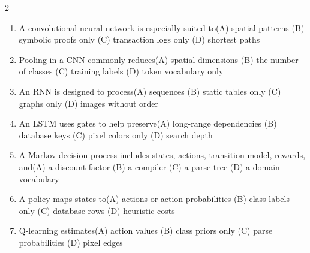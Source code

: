 \documentclass[a4paper]{article}
\begin{document}
\begin{multicols*}{2}
\begin{enumerate}[resume]
\item A convolutional neural network is especially suited to\newline\hspace*{0.6em}(A) spatial patterns \quad (B) symbolic proofs only \newline\hspace*{0.6em}(C) transaction logs only \quad (D) shortest paths
\item Pooling in a CNN commonly reduces\newline\hspace*{0.6em}(A) spatial dimensions \quad (B) the number of classes \newline\hspace*{0.6em}(C) training labels \quad (D) token vocabulary only
\item An RNN is designed to process\newline\hspace*{0.6em}(A) sequences \quad (B) static tables only \newline\hspace*{0.6em}(C) graphs only \quad (D) images without order
\item An LSTM uses gates to help preserve\newline\hspace*{0.6em}(A) long-range dependencies \quad (B) database keys \newline\hspace*{0.6em}(C) pixel colors only \quad (D) search depth
\item A Markov decision process includes states, actions, transition model, rewards, and\newline\hspace*{0.6em}(A) a discount factor \quad (B) a compiler \newline\hspace*{0.6em}(C) a parse tree \quad (D) a domain vocabulary
\item A policy maps states to\newline\hspace*{0.6em}(A) actions or action probabilities \quad (B) class labels only \newline\hspace*{0.6em}(C) database rows \quad (D) heuristic costs
\item Q-learning estimates\newline\hspace*{0.6em}(A) action values \quad (B) class priors only \newline\hspace*{0.6em}(C) parse probabilities \quad (D) pixel edges

\end{enumerate}
\end{multicols*}
\end{document}
